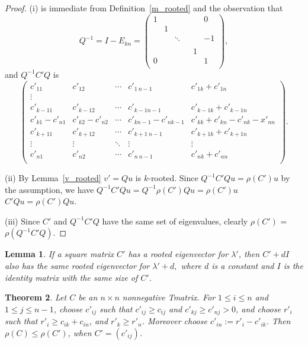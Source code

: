 \documentclass[12pt]{report}%
\theoremstyle{plain}
\newtheorem{thm}{Theorem}[chapter]
\newtheorem{lem}[thm]{Lemma}
\theoremstyle{definition}
\begin{document}
\begin{proof}
(i) is immediate from Definition~\ref{m_rooted} and the observation that
$$Q^{-1}=I-E_{kn}=\begin{pmatrix}
1 &  & & &  & 0 \\
 & 1 &  &      &  &  \\
 &  & \ddots & &  & -1 \\
 &  &        & &  &  \\
  &  & & & 1 &  \\
0 &  & & &  & 1 \\
\end{pmatrix},$$
and $Q^{-1}C'Q$ is
$$\begin{pmatrix}
c'_{11}     & c'_{12} & \cdots     & c'_{1\ n-1} & c'_{1k}+c'_{1n} \\
\vdots \\
c'_{k-11}     & c'_{k-1 2}           & \cdots     & c'_{k-1 n-1} & c'_{k-1k}+c'_{k-1n} \\
c'_{k1}-c'_{n1} & c'_{k2}-c'_{n2} &\cdots      &c'_{kn-1}-c'_{nk-1}& c'_{kk}+c'_{kn}-c'_{nk}-x'_{nn}\\
c'_{k+11}     & c'_{k+12}           & \cdots     & c'_{k+1\ n-1} & c'_{k+1k}+c'_{k+1n} \\
\vdots              & \vdots & \ddots              & \vdots & \vdots \\
c'_{n1}             & c'_{n2} & \cdots             & c'_{n\ n-1} & c'_{nk}+c'_{nn} \\
\end{pmatrix}.
$$



(ii)
By Lemma~\ref{v_rooted} $v'=Qu$ is $k$-rooted.
Since $Q^{-1}C'Qu=\rho(C')u$ by the assumption, we have
$Q^{-1} C' Q u  = Q^{-1} \rho(C') Qu  =\rho(C')u$  \\
$C'Qu=\rho(C')Qu$.



(iii)
Since $C'$ and $Q^{-1}C'Q$ have the same set of eigenvalues, clearly $\rho(C')$ = $\rho(Q^{-1}C'Q)$.

\end{proof}


\begin{lem}\label{l_diag}
If a square matrix $C'$ has a rooted eigenvector for $\lambda'$, then $C'+dI$ also has
the same rooted eigenvector for $\lambda'+d,$ where $d$ is a constant and $I$ is the identity matrix with the same size of $C'$.
\end{lem}

\begin{thm}
Let $C$ be an $n\times n$ nonnegative Tmatrix. For $1\leq i \leq n$ and $1\leq j\leq n-1$, choose $c'_{ij}$
such that $c'_{ij}\geq c_{ij}$ and $c'_{kj}\geq c'_{nj}>0$, and choose $r'_i$ such that $r'_i\geq c_{ik}+c_{in}$, and
$r'_k \geq r'_n$. Moreover choose $c'_{in}:=r'_i-c'_{ik}$. Then $\rho(C)\leq \rho(C')$, when $C'=(c'_{ij})$.
\end{thm}
\end{document}
